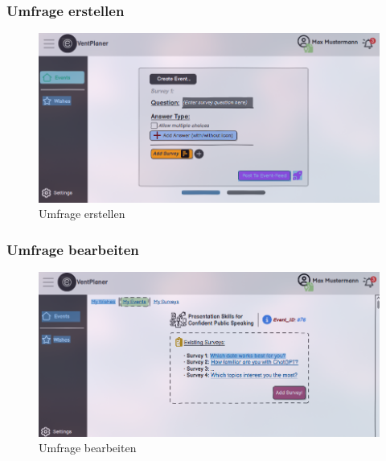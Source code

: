 \documentclass[a4paper,12pt]{article}
\begin{document}
\subsubsection{Umfrage erstellen}
\begin{figure}[H]
    \centering
    \includegraphics[width=1\textwidth]{Abbildungen/events/create_survey.png}
    \caption{Umfrage erstellen}
    \label{fig:create_survey}
\end{figure}

\subsubsection{Umfrage bearbeiten}
\begin{figure}[H]
    \centering
    \includegraphics[width=1\textwidth]{Abbildungen/events/edit_survey.png}
    \caption{Umfrage bearbeiten}
    \label{fig:edit_survey}
\end{figure}
\end{document}
